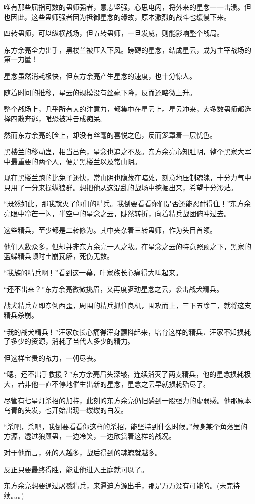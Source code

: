 \begin{this_body}
唯有那些屈指可数的蛊师强者，意志坚强，心思电闪，将外来的星念一一击溃。但也因此，这些蛊师强者因为抵御星念的缘故，原本激烈的战斗也缓慢下来。

四转蛊师，可以纵横战场，但五转蛊师，一旦发威，则能影响整个战局。

东方余亮全力出手，黑楼兰被压入下风。磅礴的星念，结成星云，成为主宰战场的第一力量！

星念虽然消耗极快，但东方余亮产生星念的速度，也十分惊人。

随着时间的推移，星云的规模没有丝毫下降，反而还略微上升。

整个战场上，几乎所有人的注意力，都集中在星云上。星云冲来，大多数蛊师都选择四散奔逃，唯恐被冲击成痴呆。

然而东方余亮的脸上，却没有丝毫的喜悦之色，反而笼罩着一层忧色。

黑楼兰的移动蛊，相当出色，星念也追之不及。东方余亮心知肚明，整个黑家大军中最重要的两个人，便是黑楼兰以及常山阴。

现在黑楼兰跑的比兔子还快，常山阴也隐藏在暗处，刻意地压制魂魄，十分力气中只用了一分来操纵狼群。想把他从这混乱的战场中挖掘出来，希望十分渺茫。

“既然如此，那我就灭了你们的精兵。我倒要看看你们是否还能忍耐得住！”东方余亮眼中冷芒一闪，半空中的星念之云，陡然转折，向着精兵战团俯冲过去。

这些精兵，至少都是二转修为。其中夹杂着三转蛊师，作为头目首领。

他们人数众多，但却并非东方余亮一人之敌。在星念之云的特意照顾之下，黑家的蓝蝶精兵顿时土崩瓦解，死伤无数。

“我族的精兵啊！”看到这一幕，叶家族长心痛得大叫起来。

“还不出来？”东方余亮微微挑眉，又再度驱动星念之云，袭击战犬精兵。

战犬精兵立即东倒西歪，周围的精兵抓住良机，围攻而上，三下五除二，就将这支精兵杀崩。

“我的战犬精兵！”汪家族长心痛得浑身颤抖起来，培育这样的精兵，汪家不知损耗了多少的资源，消耗了当代人多少的精力。

但这样宝贵的战力，一朝尽丧。

“嗯，还不出手救援？”东方余亮眉头深皱，连续消灭了两支精兵，他的星念损耗极大，若非他一直不停地催生出新的星念，星念之云早就损耗殆尽了。

尽管有七星灯杀招的加持，此刻的东方余亮仍旧感到一股强力的虚弱感。他那原本乌青的头发，也开始出现一缕缕的白发。

“杀吧，杀吧，我倒要看看你这样的杀招，能坚持到什么时候。”藏身某个角落里的方源，透过狼顾蛊，一边冷笑，一边欣赏着这样的战况。

对于他而言，死的人越多，战后得到的魂魄就越多。

反正只要最终得胜，能让他进入王庭就可以了。

东方余亮想要通过屠戮精兵，来逼迫方源出手，那是万万没有可能的。(未完待续。。。)

\end{this_body}

